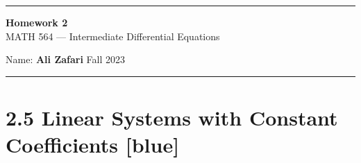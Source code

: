 \documentclass[12pt, letterpaper]{scrartcl}
\begin{document}
\begin{center}
    \hrule
    \vspace{0.4cm}
    { \textbf{{\large Homework 2}} \\ MATH 564 --- Intermediate Differential Equations}
\end{center}
{ Name: \textbf{Ali Zafari} \hspace{\fill} Fall 2023 } \newline\hrule

\section*{2.5 Linear Systems with Constant Coefficients \xrfill[2pt]{3pt}[blue]}
\end{document}
